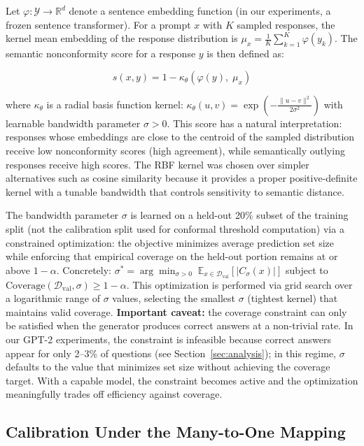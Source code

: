\documentclass{article}
\begin{document}
Let $\varphi: \mathcal{Y} \rightarrow \mathbb{R}^d$ denote a sentence embedding function (in our experiments, a frozen sentence transformer). For a prompt $x$ with $K$ sampled responses, the kernel mean embedding of the response distribution is $\mu_x = \frac{1}{K} \sum_{k=1}^{K} \varphi(y_k)$. The semantic nonconformity score for a response $y$ is then defined as:

\begin{equation}
s(x, y) = 1 - \kappa_\theta(\varphi(y),\; \mu_x)
\end{equation}

where $\kappa_\theta$ is a radial basis function kernel: $\kappa_\theta(u, v) = \exp\!\left(-\frac{\|u - v\|^2}{2\sigma^2}\right)$ with learnable bandwidth parameter $\sigma > 0$. This score has a natural interpretation: responses whose embeddings are close to the centroid of the sampled distribution receive low nonconformity scores (high agreement), while semantically outlying responses receive high scores. The RBF kernel was chosen over simpler alternatives such as cosine similarity because it provides a proper positive-definite kernel with a tunable bandwidth that controls sensitivity to semantic distance.

The bandwidth parameter $\sigma$ is learned on a held-out 20\% subset of the training split (not the calibration split used for conformal threshold computation) via a constrained optimization: the objective minimizes average prediction set size while enforcing that empirical coverage on the held-out portion remains at or above $1 - \alpha$. Concretely: $\sigma^* = \arg\min_{\sigma > 0} \;\mathbb{E}_{x \in \mathcal{D}_{\text{val}}}[|C_\sigma(x)|]$ subject to $\text{Coverage}(\mathcal{D}_{\text{val}}, \sigma) \geq 1 - \alpha$. This optimization is performed via grid search over a logarithmic range of $\sigma$ values, selecting the smallest $\sigma$ (tightest kernel) that maintains valid coverage. \textbf{Important caveat:} the coverage constraint can only be satisfied when the generator produces correct answers at a non-trivial rate. In our GPT-2 experiments, the constraint is infeasible because correct answers appear for only 2--3\% of questions (see Section~\ref{sec:analysis}); in this regime, $\sigma$ defaults to the value that minimizes set size without achieving the coverage target. With a capable model, the constraint becomes active and the optimization meaningfully trades off efficiency against coverage.

\subsection{Calibration Under the Many-to-One Mapping}
\end{document}
